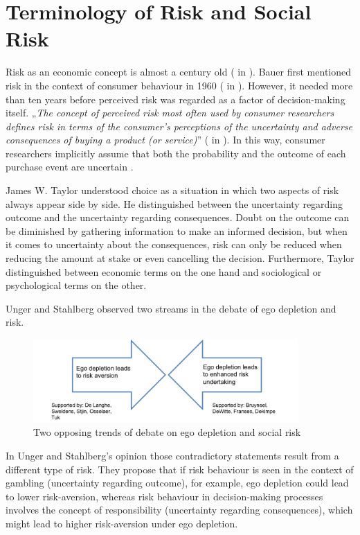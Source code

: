 \section{Terminology of Risk and Social Risk}
Risk as an economic concept is almost a century old (\cite{knight1921risk} in \cite{dowling1994model}). Bauer first mentioned risk in the context of consumer behaviour in 1960 (\cite{bauer1960consumer} in \cite{ross1975perceived}). However, it needed more than ten years before perceived risk was regarded as a factor of decision-making itself. „\emph{The concept of perceived risk most often used by consumer researchers defines risk in terms of the consumer's perceptions of the uncertainty and adverse consequences of buying a product (or service)}” (\cite{engel1973blackwell} in \cite{ross1975perceived}). In this way, consumer researchers implicitly assume that both the probability and the outcome of each purchase event are uncertain \citep{dowling1994model}.\par
James W. Taylor \citep{taylor1974role} understood choice as a situation in which two aspects of risk always appear side by side. He distinguished between the uncertainty regarding outcome and the uncertainty regarding consequences. Doubt on the outcome can be diminished by gathering information to make an informed decision, but when it comes to uncertainty about the consequences, risk can only be reduced when reducing the amount at stake or even cancelling the decision. Furthermore, Taylor distinguished between economic terms on the one hand and sociological or psychological terms on the other.\par
Unger and Stahlberg \citep{unger2011ego} observed two streams in the debate of ego depletion and risk. 
\begin{figure}[h!]
\center
	\includegraphics[width=0.9\textwidth]{images/twostreams.png}
  \caption{Two opposing trends of debate on ego depletion and social risk \citep{unger2011ego}} \label{fig:twostreams}
\end{figure}
In Unger and Stahlberg’s opinion those contradictory statements result from a different type of risk. They propose that if risk behaviour is seen in the context of gambling (uncertainty regarding outcome), for example, ego depletion could lead to lower risk-aversion, whereas risk behaviour in decision-making processes involves the concept of responsibility (uncertainty regarding consequences), which might lead to higher risk-aversion under ego depletion. \par
